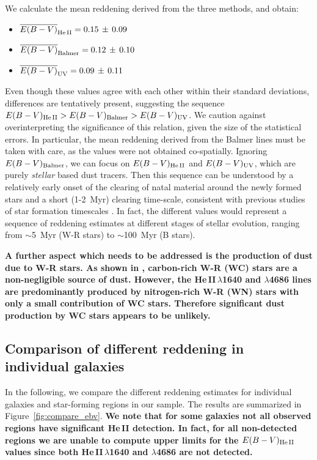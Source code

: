 \documentclass[linenumbers]{aastex63}
\begin{document}
We calculate the mean reddening derived from the three methods, and obtain:
\begin{itemize}
    \item \;$\overline{E(B-V)}_{\rm He\,II} = 0.15\,\pm\,0.09$  \item \;$\overline{E(B-V)}_{\rm Balmer} = 0.12\,\pm\,0.10$
    \item \;$\overline{E(B-V)}_{\rm UV} = 0.09\,\pm\,0.11$
\end{itemize}
%
Even though these values agree with each other within their standard deviations, differences are tentatively present, suggesting the sequence
$E(B-V)_{\rm He\,II} > E(B-V)_{\rm Balmer} > E(B-V)_{\rm UV}$. We caution against overinterpreting the significance of this relation, given the size of the statistical errors. In particular, the mean reddening derived from the Balmer lines must be taken with care, as the values were not obtained co-spatially. Ignoring $E(B-V)_{\rm Balmer}$, we can focus on $E(B-V)_{\rm He\,II}$ and $E(B-V)_{\rm UV}$, which are purely {\it stellar} based dust tracers. Then this sequence can be understood by a relatively early onset of the clearing of natal material around the newly formed stars and a short (1-2~Myr) clearing time-scale, consistent with previous studies of star formation timescales \citep[e.g.,][]{whitmore_using_2011,hollyhead_studying_2015, sokal_prevalence_2016,hannon_h_2022}. In fact, the different values would represent a sequence of reddening estimates at different stages of stellar evolution, ranging from $\sim$5~Myr (W-R stars) to $\sim$100~Myr (B stars).

\textbf{A further aspect which needs to be addressed is the production of dust due to W-R stars. As shown in \citet{lau_revisiting_2020,lau_nested_2022}, carbon-rich W-R (WC) stars are a non-negligible source of dust. However, the He\,II\,$\lambda$1640 and $\lambda$4686 lines are predominantly produced by nitrogen-rich W-R (WN) stars with only a small contribution of WC stars. 
Therefore significant dust production by WC stars appears to be unlikely.}

\subsection{Comparison of different reddening in individual galaxies}

In the following, we compare the different reddening estimates for individual galaxies and star-forming regions in our sample. The results are summarized in Figure~\ref{fig:compare_ebv}. \textbf{We note that for some galaxies not all observed regions have significant He\,II detection. In fact, for all non-detected regions we are unable to compute upper limits for the $E(B-V)_{\rm He\,II}$ values since both He\,II\,$\lambda$1640 and $\lambda$4686 are not detected.}
\end{document}
